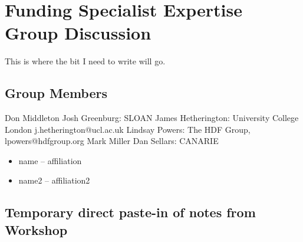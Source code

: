 \section{Funding Specialist Expertise Group Discussion}
\label{sec:appendix_funding_spec_expert}


This is where the bit I need to write will go.

\subsection{Group Members}

Don Middleton
Josh Greenburg: SLOAN
James Hetherington: University College London j.hetherington@ucl.ac.uk
Lindsay Powers: The HDF Group, lpowers@hdfgroup.org
Mark Miller
Dan Sellars: CANARIE

\begin{itemize}
\item name -- affiliation
\item name2 -- affiliation2
\end{itemize}

\subsection{Temporary direct paste-in of notes from Workshop}

